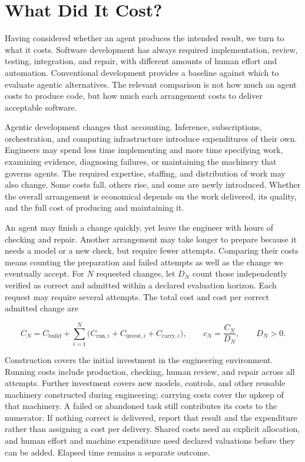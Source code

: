 \section{What Did It Cost?}\label{heading:cost-and-failure-separately}


Having considered whether an agent produces the intended result, we turn to what it costs. Software development has always required implementation, review, testing, integration, and repair, with different amounts of human effort and automation. Conventional development provides a baseline against which to evaluate agentic alternatives. The relevant comparison is not how much an agent costs to produce code, but how much each arrangement costs to deliver acceptable software.

Agentic development changes that accounting. Inference, subscriptions, orchestration, and computing infrastructure introduce expenditures of their own. Engineers may spend less time implementing and more time specifying work, examining evidence, diagnosing failures, or maintaining the machinery that governs agents. The required expertise, staffing, and distribution of work may also change. Some costs fall, others rise, and some are newly introduced. Whether the overall arrangement is economical depends on the work delivered, its quality, and the full cost of producing and maintaining it.

An agent may finish a change quickly, yet leave the engineer with hours of checking and repair. Another arrangement may take longer to prepare because it needs a model or a new check, but require fewer attempts. Comparing their costs means counting the preparation and failed attempts as well as the change we eventually accept. For \(N\) requested changes, let \(D_N\) count those independently verified as correct and admitted within a declared evaluation horizon. Each request may require several attempts. The total cost and cost per correct admitted change are

\[
C_N=C_{\text{build}}+\sum_{i=1}^{N}\bigl(C_{\text{run},i}+C_{\text{invest},i}+C_{\text{carry},i}\bigr),\qquad c_N=\frac{C_N}{D_N},\qquad D_N>0.
\]

Construction covers the initial investment in the engineering environment. Running costs include production, checking, human review, and repair across all attempts. Further investment covers new models, controls, and other reusable machinery constructed during engineering; carrying costs cover the upkeep of that machinery. A failed or abandoned task still contributes its costs to the numerator. If nothing correct is delivered, report that result and the expenditure rather than assigning a cost per delivery. Shared costs need an explicit allocation, and human effort and machine expenditure need declared valuations before they can be added. Elapsed time remains a separate outcome.


